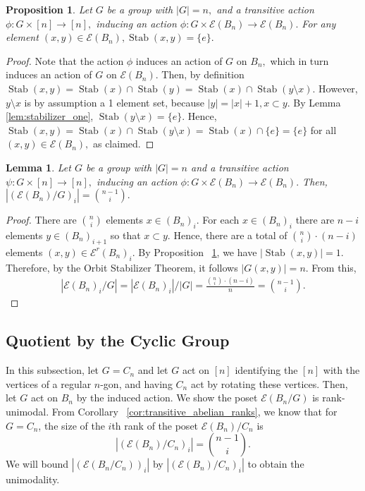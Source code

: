 \documentclass[10 pt]{amsart}
\theoremstyle{plain}
\newtheorem{prop}[thm]{Proposition}
\newtheorem{lem}[thm]{Lemma}
\theoremstyle{definition}
\theoremstyle{remark}
\numberwithin{equation}{section}
\newcommand\ssec{\subsection}
\def\Stab{\operatorname{Stab}}
\begin{document}
\begin{prop}
\label{prop:stabilizer_edge}
Let $G$ be a group with $|G| = n,$ and a transitive action $\phi:G \times [n] \rightarrow [n],$ inducing an action $\phi:G \times \mathcal E(B_n)\rightarrow \mathcal E(B_n).$ For any element $(x , y) \in \mathcal E(B_n),\Stab(x, y) = \{e\}.$
\end{prop}
\begin{proof}
Note that the action $\phi$ induces an action of $G$ on $B_n,$ which in turn induces an action of $G$ on $\mathcal E(B_n).$ Then, by definition $\Stab(x, y) = \Stab(x) \cap \Stab(y) = \Stab(x) \cap \Stab(y \setminus x).$ However, $y \setminus x$ is by assumption a 1 element set, because $|y| = |x| +1,x \subset y.$ By Lemma \ref{lem:stabilizer_one}, $\Stab(y\setminus x) = \{e\}.$ Hence, $\Stab(x, y)=\Stab(x) \cap \Stab(y \setminus x) = \Stab(x) \cap \{e\} = \{e\}$ for all $(x, y) \in \mathcal E(B_n),$ as claimed.
\end{proof}

\begin{lem}
\label{lem:q_counts}
Let $G$ be a group with $|G| = n$ and a transitive action $\psi:G \times [n] \rightarrow [n],$ inducing an action $\phi:G \times \mathcal E(B_n)\rightarrow \mathcal E(B_n).$ Then, $\displaystyle |(\mathcal E(B_n)/G)_i| = \binom{n-1}{i}.$
\end{lem}
\begin{proof}
There are $\binom{n}{i}$ elements $x\in(B_n)_i.$ For each $x \in (B_n)_i$ there are $n-i$ elements $y \in (B_n)_{i+1}$ so that $x \subset y.$ Hence, there are a total of $\binom{n}{i}\cdot (n-i)$ elements $(x, y) \in \mathcal E^r(B_n)_i.$ By Proposition ~\ref{prop:stabilizer_edge}, we have $|\Stab(x, y)| = 1.$ Therefore, by the Orbit Stabilizer Theorem, it follows $|G(x, y)| = n.$ From this,
\begin{align*}
|\mathcal E(B_n)_i/G| = |\mathcal E(B_n)_i|/|G| = \frac{\binom{n}{i}\cdot (n-i)}{n} = \binom {n-1}{i}.
\end{align*}
\end{proof}






\ssec{Quotient by the Cyclic Group}
\label{sec:cyclic}

In this subsection, let $G = C_n$ and let $G$ act on $[n]$ identifying the $[n]$ with the vertices of a regular $n$-gon, and having $C_n$ act by rotating these vertices. Then, let $G$ act on $B_n$ by the induced action. We show the poset $ \mathcal E(B_n/G)$ is rank-unimodal. From Corollary ~\ref{cor:transitive_abelian_ranks}, we know that for $G = C_n$, the size of the $i$th rank of the poset $ \mathcal E (B_n)/C_n$ is $$|( \mathcal E (B_n)/C_n)_i| = \binom{n-1}{i}.$$
We will bound $|( \mathcal E(B_n/C_n))_i|$ by  $|( \mathcal E (B_n)/C_n)_i|$ to obtain the unimodality. 
\end{document}
